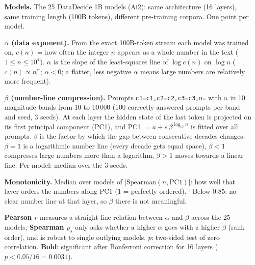 \documentclass[11pt]{article}
\begin{document}
\begin{table}[ht]
\begin{threeparttable}
\begin{tablenotes}
\item \textbf{Models.} The 25 DataDecide 1B models (Ai2): same architecture (16 layers), same
training length (100B tokens), different pre-training corpora. One point per model.
\item \textbf{$\alpha$ (data exponent).} From the exact 100B-token stream each model was trained on,
$c(n)$ = how often the integer $n$ appears as a whole number in the text ($1\le n\le 10^4$).
$\alpha$ is the slope of the least-squares line of $\log c(n)$ on $\log n$
($c(n)\propto n^{\alpha}$; $\alpha<0$; a flatter, less negative $\alpha$ means large numbers are
relatively more frequent).
\item \textbf{$\beta$ (number-line compression).} Prompts \texttt{c1=c1,c2=c2,c3=c3,n=} with $n$
in 10 magnitude bands from 10 to 10\,000 (100 correctly answered prompts per band and seed,
3 seeds). At each layer the hidden state of the last token is projected on its first principal
component (PC1), and PC1 $= a + s\,\beta^{\log_{10} n}$ is fitted over all prompts. $\beta$ is the
factor by which the gap between consecutive decades changes: $\beta=1$ is a logarithmic number
line (every decade gets equal space), $\beta<1$ compresses large numbers more than a logarithm,
$\beta>1$ moves towards a linear line. Per model: median over the 3 seeds.
\item \textbf{Monotonicity.} Median over models of $|\text{Spearman}(n,\mathrm{PC1})|$: how well that
layer orders the numbers along PC1 (1 = perfectly ordered). $^\dagger$\,Below 0.85: no clear
number line at that layer, so $\beta$ there is not meaningful.
\item \textbf{Pearson $r$} measures a straight-line relation between $\alpha$ and $\beta$ across
the 25 models; \textbf{Spearman $\rho_s$} only asks whether a higher $\alpha$ goes with a higher
$\beta$ (rank order), and is robust to single outlying models. $p$: two-sided test of zero
correlation. \textbf{Bold}: significant after Bonferroni correction for 16 layers
($p<0.05/16=0.0031$).
\end{tablenotes}
\end{threeparttable}
\end{table}
\end{document}
